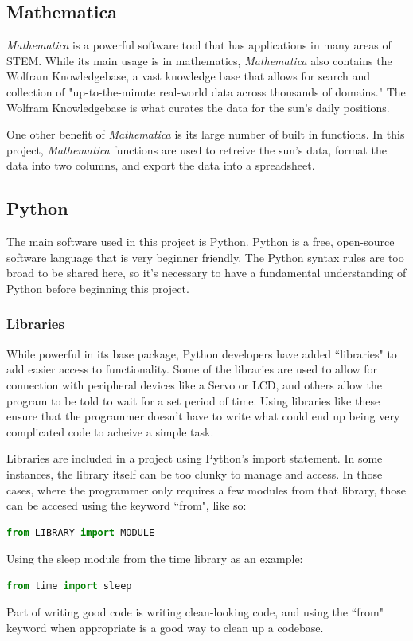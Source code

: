 \documentclass[titlepage]{article}
\begin{document}
\subsection*{Mathematica}
\textit{Mathematica} is a powerful software tool that has applications in many areas of STEM. While its main usage is in mathematics, \textit{Mathematica} also contains the Wolfram Knowledgebase, a vast knowledge base that allows for search and collection of "up-to-the-minute real-world data across thousands of domains."\cite{mathematica} The Wolfram Knowledgebase is what curates the data for the sun's daily positions. \par
One other benefit of \textit{Mathematica} is its large number of built in functions. In this project, \textit{Mathematica} functions are used to retreive the sun's data, format the data into two columns, and export the data into a spreadsheet. 
\subsection*{Python}
The main software used in this project is Python. Python is a free, open-source software language that is very beginner friendly. The Python syntax rules are too broad to be shared here, so it's necessary to have a fundamental understanding of Python before beginning this project. \par
\subsubsection*{Libraries}
While powerful in its base package, Python developers have added ``libraries" to add easier access to functionality. Some of the libraries are used to allow for connection with peripheral devices like a Servo or LCD, and others allow the program to be told to wait for a set period of time. Using libraries like these ensure that the programmer doesn't have to write what could end up being very complicated code to acheive a simple task. \par
Libraries are included in a project using Python's import statement. In some instances, the library itself can be too clunky to manage and access. In those cases, where the programmer only requires a few modules from that library, those can be accesed using the keyword ``from", like so:
\begin{lstlisting}[language=python]
from LIBRARY import MODULE
\end{lstlisting}
Using the sleep module from the time library as an example: 
\begin{lstlisting}[language=python]
from time import sleep
\end{lstlisting}
Part of writing good code is writing clean-looking code, and using the ``from" keyword when appropriate is a good way to clean up a codebase.
\end{document}
